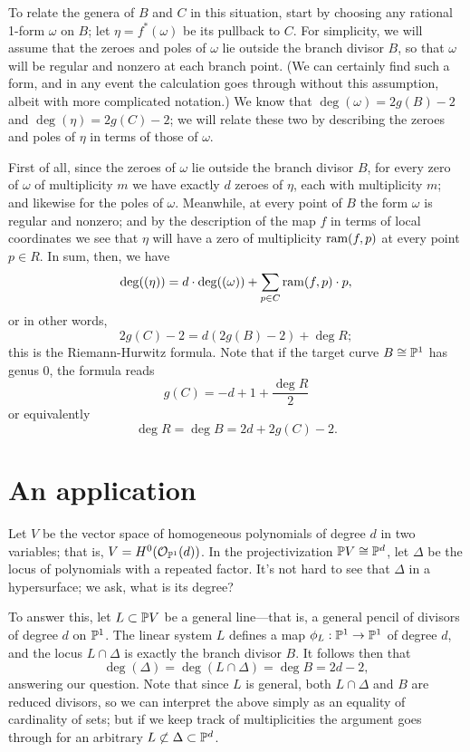  To relate the genera of $B$ and $C$ in this situation, start by choosing any rational 1-form $\omega$ on $B$; let $\eta = f^*(\omega)$ be its pullback to $C$. For simplicity, we will assume that the zeroes and poles of $\omega$ lie outside the branch divisor $B$, so that $\omega$ will be regular and nonzero at each branch point. (We can certainly find such a form, and in any event the calculation goes through without this assumption, albeit with more complicated notation.) We know that $\deg(\omega) = 2g(B) - 2$ and $\deg(\eta) = 2g(C) - 2$; we will relate these two by describing the zeroes and poles of $\eta$ in terms of those of $\omega$.
 
 First of all, since the zeroes of $\omega$ lie outside the branch divisor $B$, for every zero of $\omega$ of multiplicity $m$ we have exactly $d$ zeroes of $\eta$, each with multiplicity $m$; and likewise for the poles of $\omega$. Meanwhile, at every point of $B$ the form $\omega$ is regular and nonzero; and by the description of the map $f$ in terms of local coordinates we see that $\eta$ will have a zero of multiplicity $\ram(f,p)$ at every point $p \in R$. In sum, then, we have
 $$
 \deg((\eta)) = d\cdot \deg((\omega)) + \sum_{p \in C} \ram(f,p) \cdot p,
 $$
 or in other words,
 $$
 2g(C) - 2 = d(2g(B)-2) + \deg R;
  $$
  this is the Riemann-Hurwitz formula. Note that if the target curve $B \cong \PP^1$ has genus 0, the formula reads
  $$
  g(C) = -d  + 1+ \frac{\deg R}{2}
  $$
 or equivalently
 $$
 \deg R = \deg B  = 2d + 2g(C) - 2.
 $$
 
 \section{An application}
 
 Let $V$ be the vector space of homogeneous polynomials of degree $d$ in two variables; that is, $V = H^0(\cO_{\PP^1}(d))$. In the projectivization $\PP V \cong \PP^d$, let $\Delta$ be the locus of polynomials with a repeated factor. It's not hard to see that $\Delta$ in a hypersurface; we ask, what is its degree?
 
 To answer this, let $L \subset \PP V$ be a general line---that is, a general pencil of divisors of degree $d$ on $\PP^1$. The linear system $L$ defines a map $\phi_L : \PP^1 \to \PP^1$ of degree $d$, and the locus $L \cap \Delta$ is exactly the branch divisor $B$.
 It follows then that
 $$
 \deg(\Delta) = \deg(L \cap \Delta) = \deg B = 2d-2,
 $$
 answering our question. Note that since $L$ is general, both $L\cap \Delta$ and $B$ are reduced divisors, so we can interpret the above simply as an equality of cardinality of sets; but if we keep track of multiplicities the argument goes through for an arbitrary $L \not\subset \Delta \subset \PP^d$.

